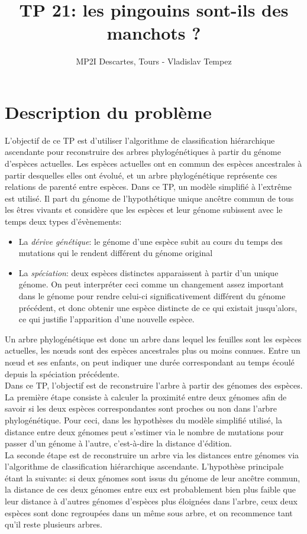 \documentclass[a4paper, 10pt]{article}
\author{MP2I Descartes, Tours - Vladislav Tempez}
\title{TP 21: les pingouins sont-ils des manchots ?}
\begin{document}
\maketitle
\section{Description du problème}
L'objectif de ce TP est d'utiliser l'algorithme de classification hiérarchique ascendante pour reconstruire des arbres phylogénétiques à partir du génome d'espèces actuelles.
Les espèces actuelles ont en commun des espèces ancestrales à partir desquelles elles ont évolué, et un arbre phylogénétique représente ces relations de parenté entre espèces. Dans ce TP, un modèle simplifié à l'extrême est utilisé. Il part du génome de l'hypothétique unique ancêtre commun de tous les êtres vivants et considère que les espèces et leur génome subissent avec le temps deux types d'évènements:
\begin{itemize}
\item La \emph{dérive génétique}: le génome d'une espèce subit au cours du temps des mutations qui le rendent différent du génome original
\item La \emph{spéciation}: deux espèces distinctes apparaissent à partir d'un unique génome. On peut interpréter ceci comme un changement assez important dans le génome pour rendre celui-ci significativement différent du génome précédent, et donc obtenir une espèce distincte de ce qui existait jusqu'alors, ce qui justifie l'apparition d'une nouvelle espèce.
\end{itemize}
Un arbre phylogénétique est donc un arbre dans lequel les feuilles sont les espèces actuelles, les nœuds sont des espèces ancestrales plus ou moins connues. Entre un nœud et ses enfants, on peut indiquer une durée correspondant au temps écoulé depuis la spéciation précédente.\\
Dans ce TP, l'objectif est de reconstruire l'arbre à partir des génomes des espèces. La première étape consiste à calculer la proximité entre deux génomes afin de savoir si les deux espèces correspondantes sont proches ou non dans l'arbre phylogénétique. Pour ceci, dans les hypothèses du modèle simplifié utilisé, la distance entre deux génomes peut s'estimer via le nombre de mutations pour passer d'un génome à l'autre, c'est-à-dire la distance d'édition.\\
La seconde étape est de reconstruire un arbre via les distances entre génomes via l'algorithme de classification hiérarchique ascendante. L'hypothèse principale étant la suivante: si deux génomes sont issus du génome de leur ancêtre commun, la distance de ces deux génomes entre eux est probablement bien plus faible que leur distance à d'autres génomes d'espèces plus éloignées dans l'arbre, ceux deux espèces sont donc regroupées dans un même sous arbre, et on recommence tant qu'il reste plusieurs arbres.\\
\end{document}
